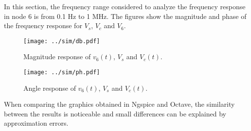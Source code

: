 In this section, the frequency range considered to analyze the frequency response in node 6 is from 0.1 Hz to 1 MHz. The figures show the magnitude and phase of the frequency response for $V_s$, $V_c$ and $V_6$.

\begin{figure}[h] \centering
\vspace{-3cm}
\texttt{[image: ../sim/db.pdf]}
\caption{Magnitude response of $v_6(t)$, $V_s$ and $V_c(t)$.}
\label{fig:SIM_MAG}
\end{figure}

\begin{figure}[h] \centering
\vspace{-3cm}
\texttt{[image: ../sim/ph.pdf]}
\caption{Angle response of $v_6(t)$, $V_s$ and $V_c(t)$.}
\label{fig:SIM_ANG}
\end{figure}

When comparing the graphics obtained in Ngspice and Octave, the similarity between the results is noticeable and small differences can be explained by approximation errors.



